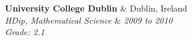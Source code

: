 \documentclass[11pt]{article}
\makeatletter
\newenvironment{newparagraph}{\par\setlength{\rightskip}{3cm}}
\newenvironment{resumeSubSectionHeader}{
    \par
    \begin{tabular*}{\textwidth}{l@{\extracolsep{\fill}}r}
    \par
} {
    \end{tabular*}
    \par
}
\newenvironment{resumeSubSectionBody}{
    \par
    \vspace{-0.8\parskip}
    \begin{small}
    \par
} {
    \par
    \end{small}
    \par
}
\makeatother
\begin{document}
%
%
\begin{resumeSubSectionHeader}

    \textbf{University College Dublin} & Dublin, Ireland \\
    \emph{HDip, Mathematical Science} & \emph{2009 to 2010} \\
    \emph{Grade: 2.1}

\end{resumeSubSectionHeader}
\begin{resumeSubSectionBody}


\end{resumeSubSectionBody}
\end{document}

